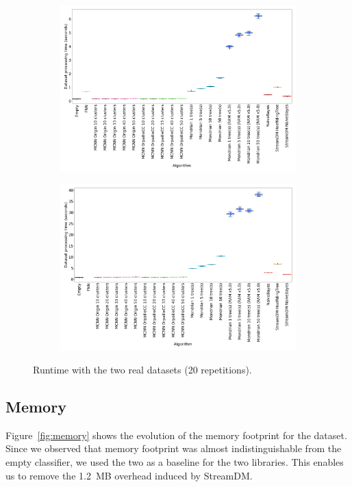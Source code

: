 \begin{figure}
	\begin{subfigure}[t]{.49\linewidth}
		\includegraphics[width=\linewidth]{figures/results/banos_6_runtime.png}
		\caption{\banosdataset}
		\label{fig:runtime-banos}
	\end{subfigure}
	\hfill
	\begin{subfigure}[t]{.49\linewidth}
		\includegraphics[width=\linewidth]{figures/results/recofit_6_runtime.png}
		\caption{\recofitdataset}
		\label{fig:runtime-recofit}
	\end{subfigure}
	\caption{Runtime with the two real datasets (20 repetitions).}
	\label{fig:runtime}
\end{figure}

\subsection{Memory}
\label{sec:result-memory}
Figure~\ref{fig:memory} shows the evolution of the memory footprint for the
\banosdataset dataset. Since we observed that \naivebayes memory footprint was
almost indistinguishable from the empty classifier, we used the two \naivebayes
as a baseline for the two libraries. This enables us to remove the 1.2~MB overhead
induced by StreamDM.

